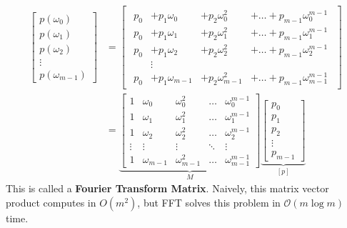 \documentclass[12pt]{article}
\renewcommand{\O}{\mathcal{O}}
\begin{document}
\begin{align*}
    \begin{bmatrix}
        p(\omega_0) \\
        p(\omega_1) \\
        p(\omega_2) \\
        \vdots      \\
        p(\omega_{m - 1})
    \end{bmatrix}
     & =
    \begin{bmatrix}
        \begin{array}{cccc}
            p_0 & + p_1 \omega_0     & + p_2 \omega_0^2     & + \dots + p_{m-1}\omega_0^{m - 1}     \\
            p_0 & + p_1 \omega_1     & + p_2 \omega_1^2     & + \dots + p_{m-1}\omega_1^{m - 1}     \\
            p_0 & + p_1 \omega_2     & + p_2 \omega_2^2     & + \dots + p_{m-1}\omega_2^{m - 1}     \\
                & \vdots             &                      &                                       \\
            p_0 & + p_1 \omega_{m-1} & + p_2 \omega_{m-1}^2 & + \dots + p_{m-1}\omega_{m-1}^{m - 1}
        \end{array}
    \end{bmatrix}
    \\
     & =
    \underbrace{\begin{bmatrix}
                        1      & \omega_0     & \omega_0^2     & \dots  & \omega_0^{m - 1}     \\
                        1      & \omega_1     & \omega_1^2     & \dots  & \omega_1^{m - 1}     \\
                        1      & \omega_2     & \omega_2^2     & \dots  & \omega_2^{m - 1}     \\
                        \vdots & \vdots       & \vdots         & \ddots & \vdots               \\
                        1      & \omega_{m-1} & \omega_{m-1}^2 & \dots  & \omega_{m-1}^{m - 1}
                    \end{bmatrix}}_{M}
    \underbrace{\begin{bmatrix}
                        p_0    \\
                        p_1    \\
                        p_2    \\
                        \vdots \\
                        p_{m - 1}
                    \end{bmatrix}}_{[p]}
\end{align*}
This is called a \textbf{Fourier Transform Matrix}. Naively, this matrix vector product computes in $O(m^2)$, but FFT solves this problem in $\O(m\log m)$ time.
\end{document}
